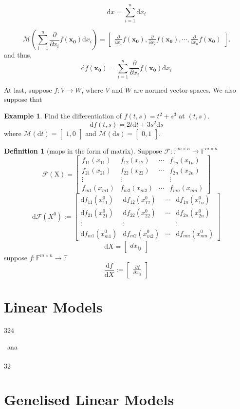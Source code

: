 \documentclass[12pt]{book}
\theoremstyle{definition}
\newtheorem{definition}{Definition}[chapter]
\newtheorem{example}{Example}[chapter]
\newcommand{\drm}{\mathrm{d}}
\newcommand{\M}{\mathcal{M}}
\newcommand{\pd}[1]{\frac{\partial}{\partial #1}}
\begin{document}
$$
\drm x = \sum_{i=1}^n \drm x_i
$$

$$
\M(\sum_{i=1}^{n} \pd{x_i}f(\mathbf{x_0})\drm x_i) = \begin{bmatrix}
	\pd{x_1}f(\mathbf{x_0}), \pd{x_2}f(\mathbf{x_0}), \cdots, \pd{x_n}f(\mathbf{x_0})
\end{bmatrix}.
$$
and thus, 
$$
\drm f(\mathbf{x_0}) = \sum_{i=1}^{n} \pd{x_i}f(\mathbf{x_0})\drm x_i
$$

At last, suppose $f:V \to W$, where $V$ and $W$ are normed vector spaces. We also suppose that 

\begin{example}
Find the differentiation of $f(t,s)=t^2+s^3$ at $(t,s)$.  \\
$$\drm f(t,s)=2t\drm t+3s^2\drm s$$
where $\M (\drm t)=\begin{bmatrix}
	1,0
\end{bmatrix}$ and $\M (\drm s)=\begin{bmatrix}
	0,1
\end{bmatrix}$.
\end{example}








\begin{definition}[maps in the form of matrix]
Suppose  $\mathcal{F}:\mathbb{F}^{m \times n} \to \mathbb{F}^{m \times n}$
$$
\mathcal F (\mathrm X) = \begin{bmatrix}
	f_{11}(x_{11}) &f_{12}(x_{12}) & \cdots & f_{1n}(x_{1n}) \\
	f_{21}(x_{21}) &f_{22}(x_{22}) & \cdots & f_{2n}(x_{2n}) \\
	\vdots &\vdots & \  & \vdots \\
	f_{m1}(x_{m1}) &f_{m2}(x_{m2}) & \cdots & f_{mn}(x_{mn}) 
\end{bmatrix}
$$	
$$
\drm \mathcal F(X^0) := \begin{bmatrix}
	\drm f_{11}(x_{11}^0) &\drm f_{12}(x_{12}^0) & \cdots &\drm f_{1n}(x_{1n}^0) \\
	\drm f_{21}(x_{21}^0) & \drm f_{22}(x_{22}^0) & \cdots & \drm f_{2n}(x_{2n}^0) \\
	\vdots &\vdots & \  & \vdots \\
	\drm f_{m1}(x_{m1}^0) & \drm f_{m2}(x_{m2}^0) & \cdots & \drm f_{mn}(x_{mn}^0) 
\end{bmatrix}
$$
$$
\drm X = \begin{bmatrix}
	dx_{ij}
\end{bmatrix}
$$
suppose $f:\mathbb F^{m \times n} \to \mathbb F$
$$
\frac{\drm f}{\drm X} := \begin{bmatrix}
	\frac{\partial f}{\partial x_{ij}}
\end{bmatrix}
$$
\end{definition}

\chapter{Linear Models}
324

 \ aaa\\
\ \\
32
\chapter{Genelised Linear Models}
\end{document}
